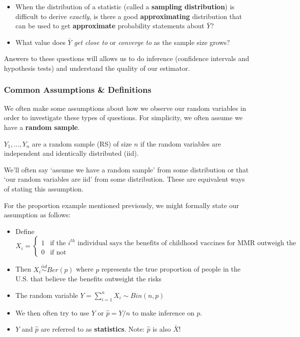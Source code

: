 \documentclass[
]{article}
\providecommand{\tightlist}{%
  \setlength{\itemsep}{0pt}\setlength{\parskip}{0pt}}
\begin{document}
\begin{itemize}
\tightlist
\item
  When the distribution of a statistic (called a \textbf{sampling
  distribution}) is difficult to derive \emph{exactly}, is there a good
  \textbf{approximating} distribution that can be used to get
  \textbf{approximate} probability statements about \(\bar{Y}\)?
\item
  What value does \(\bar{Y}\) \emph{get close to} or \emph{converge to}
  as the sample size grows?
\end{itemize}

Answers to these questions will allows us to do inference (confidence
intervals and hypothesis tests) and understand the quality of our
estimator.

\hypertarget{common-assumptions-definitions}{%
\subsubsection{Common Assumptions \&
Definitions}\label{common-assumptions-definitions}}

We often make some assumptions about how we observe our random variables
in order to investigate these types of questions. For simplicity, we
often assume we have a \textbf{random sample}.

\begin{description}
\tightlist
\item[Random Sample]
\(Y_1,..., Y_n\) are a random sample (RS) of size \(n\) if the random
variables are independent and identically distributed (iid).
\end{description}

We'll often say `assume we have a random sample' from some distribution
or that `our random variables are iid' from some distribution. These are
equivalent ways of stating this assumption.

For the proportion example mentioned previously, we might formally state
our assumption as follows:

\begin{itemize}
\tightlist
\item
  Define
  \(X_i = \begin{cases} 1 & \mbox{if the }i^{th}\mbox{ individual says the benefits of childhood vaccines for MMR outweigh the risks}\\ 0 & \mbox{if not}\end{cases}\)
\item
  Then \(X_i\stackrel{iid}\sim Ber(p)\) where \(p\) represents the true
  proportion of people in the U.S. that believe the benefits outweight
  the risks
\item
  The random variable \(Y = \sum_{i=1}^{n}X_i \sim Bin(n,p)\)
\item
  We then often try to use \(Y\) or \(\hat{p}=Y/n\) to make inference on
  \(p\).
\item
  \(Y\) and \(\hat{p}\) are referred to as \textbf{statistics}. Note:
  \(\hat{p}\) is also \(\bar{X}\)!
\end{itemize}
\end{document}
